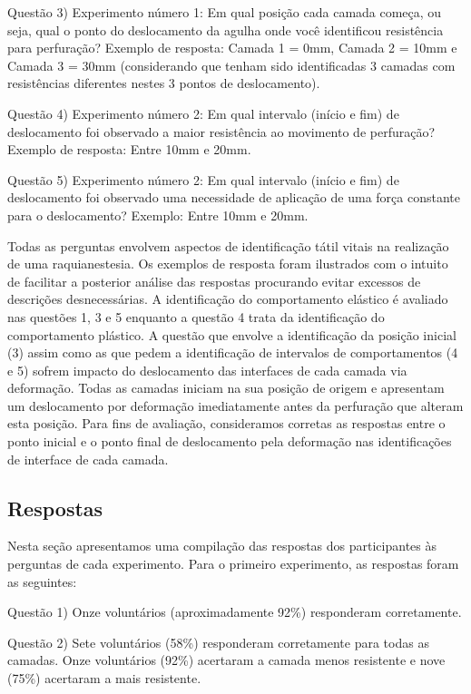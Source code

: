 Questão 3) Experimento número 1: Em qual posição cada camada começa, ou seja, qual o ponto do deslocamento da agulha onde você identificou resistência para perfuração? 
Exemplo de resposta: Camada 1 = 0mm, Camada 2 = 10mm e Camada 3 = 30mm (considerando que tenham sido identificadas 3 camadas com resistências diferentes nestes 3 pontos de deslocamento).

Questão 4) Experimento número 2: Em qual intervalo (início e fim) de deslocamento foi observado a maior resistência ao movimento de perfuração? 
Exemplo de resposta: Entre 10mm e 20mm.

Questão 5) Experimento número 2: Em qual intervalo (início e fim) de deslocamento foi observado uma necessidade de aplicação de uma força constante para o deslocamento? 
Exemplo: Entre 10mm e 20mm.

Todas as perguntas envolvem aspectos de identificação tátil vitais na realização de uma raquianestesia. Os exemplos de resposta foram ilustrados com o intuito de facilitar a posterior análise das respostas procurando evitar excessos de descrições desnecessárias. A identificação do comportamento elástico é avaliado nas questões 1, 3 e 5 enquanto a questão 4 trata da identificação do comportamento plástico. A questão que envolve a identificação da posição inicial (3) assim como as que pedem a identificação de intervalos de comportamentos (4 e 5) sofrem impacto do deslocamento das interfaces de cada camada via deformação. Todas as camadas iniciam na sua posição de origem e apresentam um deslocamento por deformação imediatamente antes da perfuração que alteram esta posição. Para fins de avaliação, consideramos corretas as respostas entre o ponto inicial e o ponto final de deslocamento pela deformação nas identificações de interface de cada camada.  

\subsection{Respostas}
\label{sec:respostas}

Nesta seção apresentamos uma compilação das respostas dos participantes às perguntas de cada experimento. Para o primeiro
experimento, as respostas foram as seguintes:

Questão 1) Onze voluntários (aproximadamente 92\%) responderam corretamente.

Questão 2) Sete voluntários (58\%) responderam corretamente para todas as camadas. Onze voluntários (92\%) acertaram a camada menos resistente e nove (75\%) acertaram a mais resistente.

